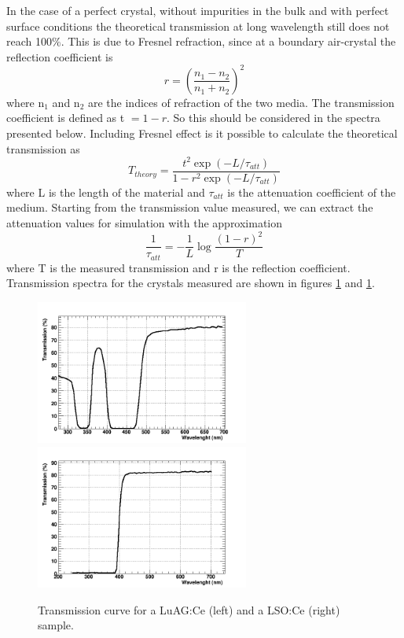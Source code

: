 In the case of a perfect crystal, without impurities in the bulk and with perfect surface conditions the theoretical transmission at long wavelength still does not reach 100$\%$. This is due to Fresnel refraction, since at a boundary air-crystal the reflection coefficient is
\begin{equation}
r = \left( \frac{n_{1}-n_{2}}{n_{1}+n_{2}} \right) ^{2}
\end{equation}
where n$_{1}$ and n$_{2}$ are the indices of refraction of the two media. The transmission coefficient is defined as t $= 1-r$.
So this should be considered in the spectra presented below.
Including Fresnel effect is it possible to calculate the theoretical transmission as
\begin{equation}
T_{theory}=\frac{t^{2} \exp{\left( -L/\tau _{att} \right)}}{1-r^{2}\exp{\left( -L/\tau _{att} \right)}}
\end{equation}
where L is the length of the material and $\tau _{att}$ is the attenuation coefficient of the medium.
Starting from the transmission value measured, we can extract the attenuation values for simulation with the approximation
\begin{equation}
\frac{1}{\tau _{att}} = -\frac{1}{L} \log{\frac{(1-r)^{2}}{T}}
\end{equation}
where T is the measured transmission and r is the reflection coefficient.
Transmission spectra for the crystals measured are shown in figures \ref{fig:luag_lso_trans} and \ref{fig:luag_lso_trans}.
\begin{figure}[htbp]
\begin{center}
\includegraphics[width=7cm]{../Pictures/Chapter_5/trans_luag.png}
\includegraphics[width=7cm]{../Pictures/Chapter_5/lso_trans.png}
\end{center}
\caption[Transmission curve for LuAG and LSO]{Transmission curve for a LuAG:Ce (left) and a LSO:Ce (right) sample.}
\label{fig:luag_lso_trans}
\end{figure}

